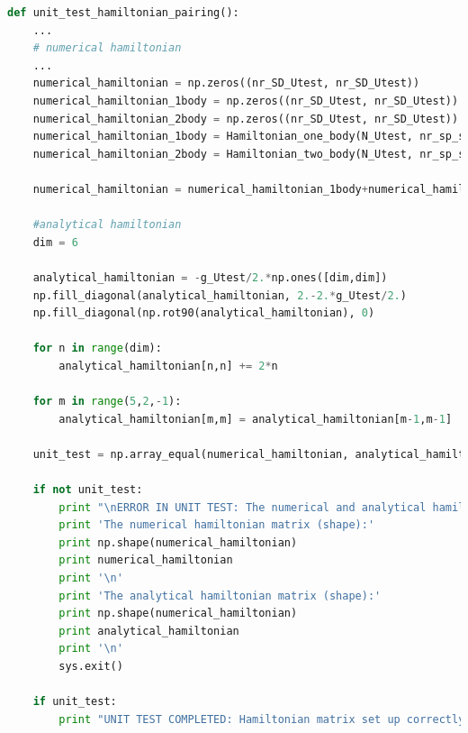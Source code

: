 \documentclass[twoside]{article}
\begin{document}
\begin{lstlisting}[language=Python, label=code: unit_test, caption= \texttt{unit\_test\_hamiltonian\_pairing()} is a unit test run by \texttt{main.py} before it starts to set up the actual Hamiltonian matrix. The unit test is only for the pairing model and compares the analytic and the numerical Hamiltonian element-wise and exits the code if they do not match. ]
def unit_test_hamiltonian_pairing():
    ... 
    # numerical hamiltonian
    ...
    numerical_hamiltonian = np.zeros((nr_SD_Utest, nr_SD_Utest))
    numerical_hamiltonian_1body = np.zeros((nr_SD_Utest, nr_SD_Utest))
    numerical_hamiltonian_2body = np.zeros((nr_SD_Utest, nr_SD_Utest))
    numerical_hamiltonian_1body = Hamiltonian_one_body(N_Utest, nr_sp_states_Utest, sp_matrix_Utest, SD_filename_Utest)
    numerical_hamiltonian_2body = Hamiltonian_two_body(N_Utest, nr_sp_states_Utest, SD_filename_Utest, tbme_filename_Utest, 'pairing')

    numerical_hamiltonian = numerical_hamiltonian_1body+numerical_hamiltonian_2body

    #analytical hamiltonian
    dim = 6
    
    analytical_hamiltonian = -g_Utest/2.*np.ones([dim,dim])
    np.fill_diagonal(analytical_hamiltonian, 2.-2.*g_Utest/2.)
    np.fill_diagonal(np.rot90(analytical_hamiltonian), 0)

    for n in range(dim):
        analytical_hamiltonian[n,n] += 2*n

    for m in range(5,2,-1):
        analytical_hamiltonian[m,m] = analytical_hamiltonian[m-1,m-1]

    unit_test = np.array_equal(numerical_hamiltonian, analytical_hamiltonian)

    if not unit_test:
        print "\nERROR IN UNIT TEST: The numerical and analytical hamiltonian matrix are not equal!\n"
        print 'The numerical hamiltonian matrix (shape):'
        print np.shape(numerical_hamiltonian)
        print numerical_hamiltonian
        print '\n'
        print 'The analytical hamiltonian matrix (shape):'
        print np.shape(numerical_hamiltonian)
        print analytical_hamiltonian
        print '\n'
        sys.exit()
        
    if unit_test:
        print "UNIT TEST COMPLETED: Hamiltonian matrix set up correctly.\n"
\end{lstlisting}
\end{document}
